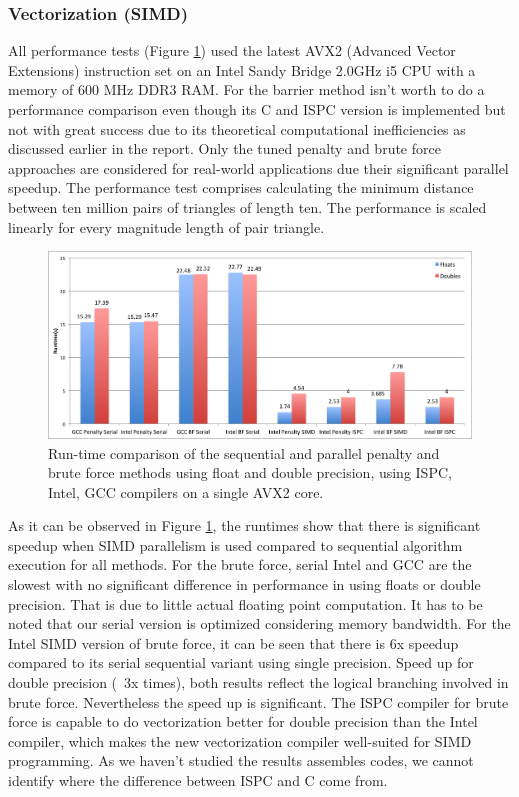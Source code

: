 \documentclass[times,12pt]{article}
\begin{document}
\subsubsection{Vectorization (SIMD)}
All performance tests (Figure \ref{fig17}) used the latest AVX2 (Advanced Vector Extensions) instruction set on an Intel Sandy Bridge 2.0GHz i5 CPU with a memory of 600 MHz DDR3 RAM. For the barrier method isn't worth to do a performance comparison even though its C and ISPC version is implemented but not with great success due to its theoretical computational inefficiencies as discussed earlier in the report. Only the tuned penalty and brute force approaches are considered for real-world applications due their significant parallel speedup. The performance test comprises calculating the minimum distance between ten million pairs of triangles of length ten. The performance is scaled linearly for every magnitude length of pair triangle. 

\begin{figure}[!h]
\centering
\includegraphics[width=1\textwidth]{perf} \protect\caption{\label{fig17}Run-time comparison of the sequential and parallel penalty and brute force methods using float and double precision, using ISPC, Intel, GCC compilers on a single AVX2 core.}
\end{figure} 

As it can be observed in Figure \ref{fig17}, the runtimes show that there is significant speedup when SIMD parallelism is used compared to sequential algorithm execution for all methods. For the brute force, serial Intel and GCC are the slowest with no significant difference in performance in using floats or double precision. That is due to little actual floating point computation. It has to be noted that our serial version is optimized considering memory bandwidth. For the Intel SIMD version of brute force, it can be seen that there is 6x speedup compared to its serial sequential variant using single precision. Speed up for double precision (~3x times), both results reflect the logical branching involved in brute force. Nevertheless the speed up is significant. The ISPC compiler for brute force is capable to do vectorization better for double precision than the Intel compiler, which makes the new vectorization compiler well-suited for SIMD programming. As we haven't studied the results assembles codes, we cannot identify where the difference between ISPC and C come from.
\end{document}
